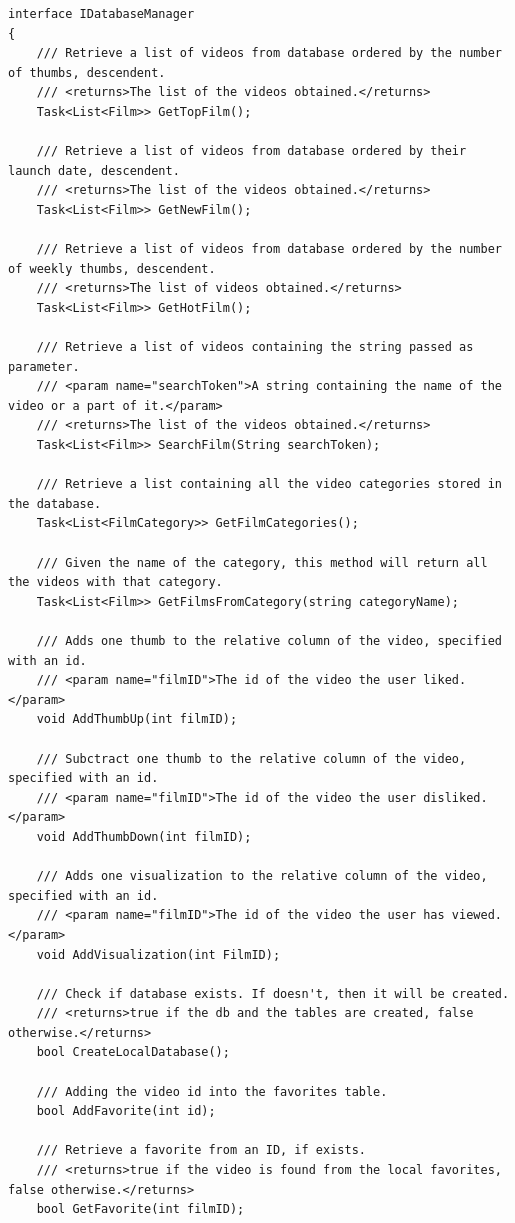 \documentclass[a4]{book}
\begin{document}
\begin{lstlisting}
interface IDatabaseManager
{
	/// Retrieve a list of videos from database ordered by the number of thumbs, descendent.
	/// <returns>The list of the videos obtained.</returns>
	Task<List<Film>> GetTopFilm();
	
	/// Retrieve a list of videos from database ordered by their launch date, descendent.
	/// <returns>The list of the videos obtained.</returns>
	Task<List<Film>> GetNewFilm();
	
	/// Retrieve a list of videos from database ordered by the number of weekly thumbs, descendent.
	/// <returns>The list of videos obtained.</returns>
	Task<List<Film>> GetHotFilm();
	
	/// Retrieve a list of videos containing the string passed as parameter.
	/// <param name="searchToken">A string containing the name of the video or a part of it.</param>
	/// <returns>The list of the videos obtained.</returns>
	Task<List<Film>> SearchFilm(String searchToken);
	
	/// Retrieve a list containing all the video categories stored in the database.
	Task<List<FilmCategory>> GetFilmCategories();
	
	/// Given the name of the category, this method will return all the videos with that category.
	Task<List<Film>> GetFilmsFromCategory(string categoryName);
	
	/// Adds one thumb to the relative column of the video, specified with an id.
	/// <param name="filmID">The id of the video the user liked.</param>
	void AddThumbUp(int filmID);
	
	/// Subctract one thumb to the relative column of the video, specified with an id.
	/// <param name="filmID">The id of the video the user disliked.</param>
	void AddThumbDown(int filmID);
	
	/// Adds one visualization to the relative column of the video, specified with an id.
	/// <param name="filmID">The id of the video the user has viewed.</param>
	void AddVisualization(int FilmID);
	
	/// Check if database exists. If doesn't, then it will be created.
	/// <returns>true if the db and the tables are created, false otherwise.</returns>
	bool CreateLocalDatabase();
	
	/// Adding the video id into the favorites table.
	bool AddFavorite(int id);
	
	/// Retrieve a favorite from an ID, if exists.
	/// <returns>true if the video is found from the local favorites, false otherwise.</returns>
	bool GetFavorite(int filmID);
	

\end{lstlisting}
\end{document}
